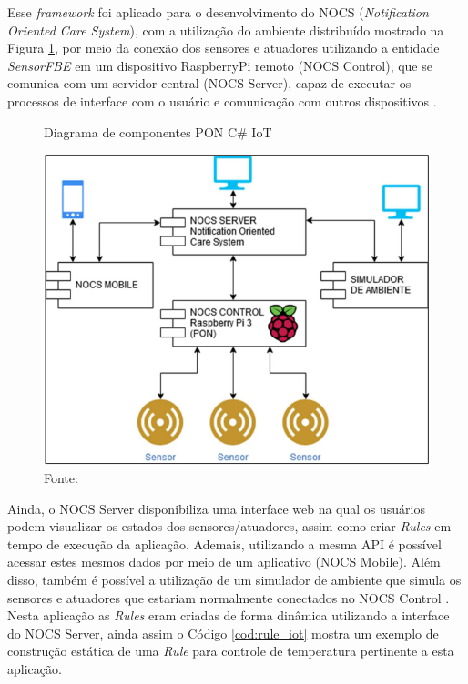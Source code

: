 Esse \textit{framework} foi aplicado para o desenvolvimento do NOCS
(\textit{Notification Oriented Care System}), com a utilização do ambiente
distribuído mostrado na Figura \ref{fig:pon_iot}, por meio da conexão dos
sensores e atuadores utilizando a entidade \textit{SensorFBE} em um dispositivo
RaspberryPi remoto (NOCS Control), que se comunica com um servidor central (NOCS
Server), capaz de executar os processos de interface com o usuário e comunicação
com outros dispositivos \cite{msc_oliveira_2019}. 

\begin{figure}[!htb]
  \centering
  \caption{Diagrama de componentes PON C\# IoT}
  \includegraphics[width=.55\textwidth]{../figures/pon_iot.png}
  \caption*{Fonte: }
  \label{fig:pon_iot}
\end{figure}

Ainda, o NOCS Server disponibiliza uma interface web na qual os usuários podem
visualizar os estados dos sensores/atuadores, assim como criar \textit{Rules} em
tempo de execução da aplicação. Ademais, utilizando a mesma API é possível acessar
estes mesmos dados por meio de um aplicativo (NOCS Mobile). Além disso, também é
possível a utilização de um simulador de ambiente que simula os sensores e
atuadores que estariam normalmente conectados no NOCS Control
\cite{msc_oliveira_2019}. Nesta aplicação as \textit{Rules} eram criadas de forma
dinâmica utilizando a interface do NOCS Server, ainda assim o Código
\ref{cod:rule_iot} mostra um exemplo de construção estática de uma \textit{Rule}
para controle de temperatura pertinente a esta aplicação.


